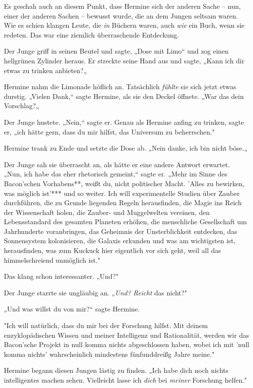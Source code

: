{Es geschah auch an diesem Punkt, dass Hermine sich der anderen Sache -- nun, einer der anderen Sachen -- bewusst wurde, die an dem Jungen seltsam waren. Wie es schien klangen Leute, die \emph{in} Büchern waren, auch \emph{wie} ein Buch, wenn sie redeten. Das war eine ziemlich überraschende Entdeckung.

Der Junge griff in seinen Beutel und sagte, „Dose mit Limo“ und zog einen hellgrünen Zylinder heraus. Er streckte seine Hand aus und sagte, „Kann ich dir etwas zu trinken anbieten?„

Hermine nahm die Limonade höflich an. Tatsächlich \emph{fühlte} sie sich jetzt etwas durstig. „Vielen Dank,“ sagte Hermine, als sie den Deckel öffnete. „War das dein Vorschlag?„

Der Junge hustete. „Nein,“ sagte er. Genau als Hermine anfing zu trinken, sagte er, „ich hätte gern, dass du mir hilfst, das Universum zu beherrschen."

Hermine trank zu Ende und setzte die Dose ab. „Nein danke, ich bin nicht böse.„

Der Junge sah sie überrascht an, als hätte er eine andere Antwort erwartet. „Nun, ich habe das eher rhetorisch gemeint,“ sagte er. „Mehr im Sinne des Bacon'schen Vorhabens**, weißt du, nicht politischer Macht. 'Alles zu bewirken, was möglich ist'*** und so weiter. Ich will experimentelle Studien über Zauber durchführen, die zu Grunde liegenden Regeln herausfinden, die Magie ins Reich der Wissenschaft holen, die Zauber- und Muggelwelten vereinen, den Lebensstandard des gesamten Planeten erhöhen, die menschliche Gesellschaft um Jahrhunderte voranbringen, das Geheimnis der Unsterblichkeit entdecken, das Sonnensystem kolonisieren, die Galaxis erkunden und was am wichtigsten ist, herausfinden, was zum Kuckuck hier eigentlich vor sich geht, weil all das himmelschreiend unmöglich ist."

Das klang schon interessanter. „Und?"

Der Junge starrte sie ungläubig an. „\emph{Und? Reicht} das nicht?"

„Und was willst du von mir?“ sagte Hermine.

"Ich will natürlich, dass du mir bei der Forschung hilfst. Mit deinem enzyklopädischen Wissen und meiner Intelligenz und Rationalität, werden wir das Bacon'sche Projekt in null komma nichts abgeschlossen haben, wobei ich mit 'null komma nichts' wahrscheinlich mindestens fünfunddreißg Jahre meine."

Hermine begann diesen Jungen lästig zu finden. „Ich habe dich noch nichts intelligentes machen sehen. Vielleicht lasse ich \emph{dich} bei \emph{meiner} Forschung helfen."

}
